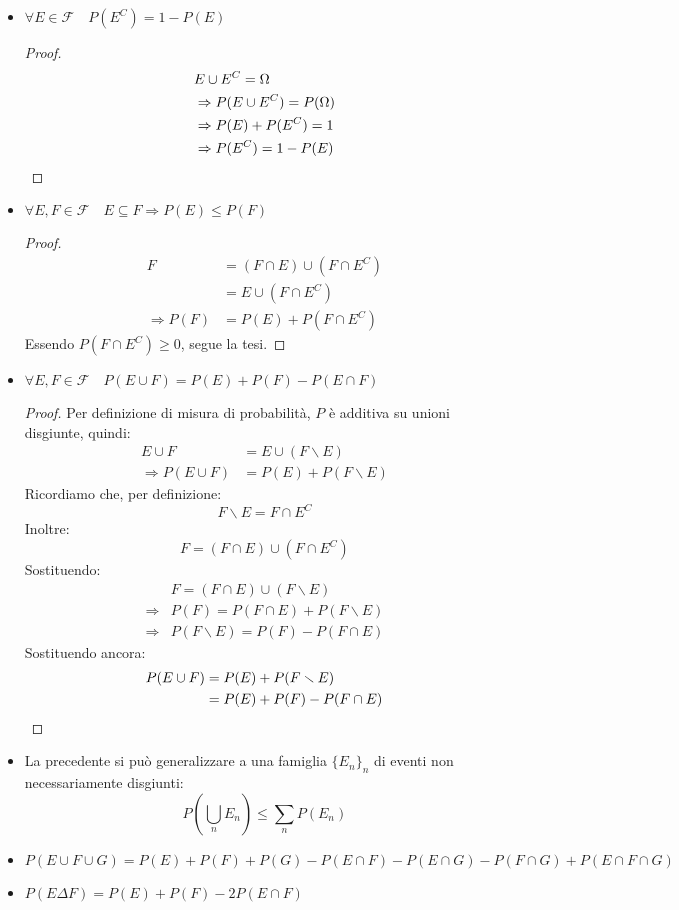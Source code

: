 \documentclass{article}
\theoremstyle{plain}
\theoremstyle{definition}
\theoremstyle{remark}
\begin{document}
\begin{itemize}
	\item $\forall E\in\mathscr{F}\quad P(E^C)=1-P(E)$
	\begin{proof}
		\begin{align*}
			&E\cup E^C=\Omega\\
			&\Rightarrow P(E\cup E^C)=P(\Omega)\\
			&\Rightarrow P(E)+P(E^C)=1\\
			&\Rightarrow P(E^C)=1-P(E)\qedhere
		\end{align*}
	\end{proof}
	\item $\forall E,F\in\mathscr{F}\quad E\subseteq F\Rightarrow P(E)\leq P(F)$
	\begin{proof}
		\begin{align*}
			F&=(F\cap E)\cup(F\cap E^C)\\
			&=E\cup(F\cap E^C)\\
			\Rightarrow P(F)&=P(E)+P(F\cap E^C)
		\end{align*}
		Essendo $P(F\cap E^C)\geq0$, segue la tesi.
	\end{proof}
	\item $\forall E,F\in\mathscr{F}\quad P(E\cup F)=P(E)+P(F)-P(E\cap F)$
	\begin{proof}
		Per definizione di misura di probabilità, $P$ è additiva su unioni disgiunte, quindi:
		\begin{align*}
			E\cup F&=E\cup (F\smallsetminus E)\\
			\Rightarrow P(E\cup F)&=P(E)+P(F\smallsetminus E)
		\end{align*}
		Ricordiamo che, per definizione:
		\begin{equation*}
			F\smallsetminus E=F\cap E^C
		\end{equation*}
		Inoltre:
		\begin{equation*}
			F=(F\cap E)\cup(F\cap E^C)
		\end{equation*}
		Sostituendo:
		\begin{align*}
			&F=(F\cap E)\cup(F\smallsetminus E)\\
			\Rightarrow &P(F)=P(F\cap E)+P(F\smallsetminus E)\\
			\Rightarrow &P(F\smallsetminus E)=P(F)-P(F\cap E)
		\end{align*}
		Sostituendo ancora:
		\begin{align*}
			P(E\cup F)&=P(E)+P(F\smallsetminus E)\\
			&=P(E)+P(F)-P(F\cap E)\qedhere
		\end{align*}
	\end{proof}
	\item La precedente si può generalizzare a una famiglia $\{E_n\}_n$ di eventi non necessariamente disgiunti:
	\begin{equation*}
		P(\bigcup_n E_n)\leq \sum_n P(E_n)
	\end{equation*}
	\item $P(E\cup F\cup G)=P(E)+P(F)+P(G)-P(E\cap F)-P(E\cap G)-P(F\cap G)+P(E\cap F\cap G)$
	\item $P(E\Delta F)=P(E)+P(F)-2P(E\cap F)$
\end{itemize}
\end{document}

